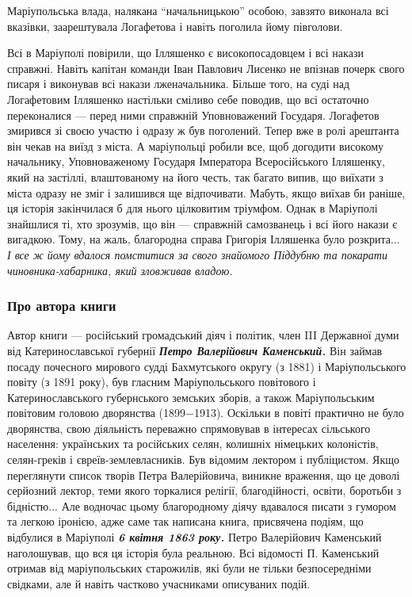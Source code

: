 Маріупольська влада, налякана \enquote{начальницькою} особою, завзято виконала
всі вказівки, заарештувала Логафетова і навіть поголила йому півголови.


Всі в Маріуполі повірили, що Ілляшенко є високопосадовцем і всі накази
справжні. Навіть капітан команди Іван Павлович Лисенко не впізнав почерк свого
писаря і виконував всі накази лженачальника. Більше того, на суді над
Логафетовим Ілляшенко настільки сміливо себе поводив, що всі остаточно
переконалися — перед ними справжній Уповноважений Государя. Логафетов змирився
зі своєю участю і одразу ж був поголений. Тепер вже в ролі арештанта він чекав
на виїзд з міста. А маріупольці робили все, щоб догодити високому начальнику,
Уповноваженому Государя Імператора Всеросійського Ілляшенку, який на застіллі,
влаштованому на його честь, так багато випив, що виїхати з міста одразу не зміг
і залишився ще відпочивати. Мабуть, якщо виїхав би раніше, ця історія
закінчилася б для нього цілковитим тріумфом. Однак в Маріуполі знайшлися ті,
хто зрозумів, що він — справжній самозванець і всі його накази є вигадкою.
Тому, на жаль, благородна справа Григорія Ілляшенка було розкрита... \emph{І все ж йому
вдалося помститися за свого знайомого Піддубню та покарати чиновника-хабарника,
який зловживав владою.}

\subsubsection{Про автора книги}


Автор книги — російський громадський діяч і політик, член III Державної думи
від Катеринославської губернії \emph{\textbf{Петро Валерійович Каменський.}} Він займав посаду
почесного мирового судді Бахмутського округу (з 1881) і Маріупольського повіту
(з 1891 року), був гласним Маріупольського повітового і Катеринославського
губернського земських зборів, а також Маріупольським повітовим головою
дворянства (1899−1913). Оскільки в повіті практично не було дворянства, свою
діяльність переважно спрямовував в інтересах сільського населення: українських
та російських селян, колишніх німецьких колоністів, селян-греків і
євреїв-землевласників. Був відомим лектором і публіцистом. Якщо переглянути
список творів Петра Валерійовича, виникне враження, що це доволі серйозний
лектор, теми якого торкалися релігії, благодійності, освіти, боротьби з
бідністю... Але водночас цьому благородному діячу вдавалося писати з гумором та
легкою іронією, адже саме так написана книга, присвячена подіям, що відбулися в
Маріуполі \emph{\textbf{6 квітня 1863 року.}} Петро Валерійович Каменський наголошував, що вся
ця історія була реальною. Всі відомості П. Каменський отримав від
маріупольських старожилів, які були не тільки безпосередніми свідками, але й
навіть частково учасниками описуваних подій.

